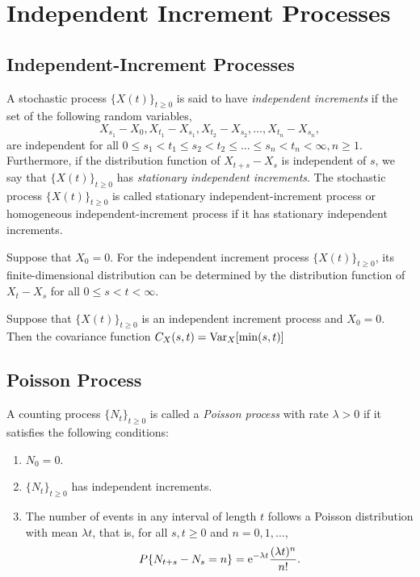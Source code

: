 \chapter{Independent Increment Processes}

\section{Independent-Increment Processes}

\begin{definition}
  A stochastic process \(\{X(t)\}_{t \geq 0}\) is said to have \emph{independent increments} if the set of the following random variables,
  \[
    X_{s_1} - X_{0}, X_{t_1} - X_{s_1}, X_{t_2} - X_{s_2}, \dots, X_{t_n} - X_{s_n},
  \]
  are independent for all \(0 \leq s_1 < t_1 \leq s_2 < t_2 \leq \dots \leq s_n < t_n < \infty, n \geq 1\). Furthermore, if the distribution function of \(X_{t + s} - X_{s}\) is independent of \(s\), we say that \(\{X(t)\}_{t \geq 0}\) has \emph{stationary independent increments}. The stochastic process \(\{X(t)\}_{t \geq 0}\) is called stationary independent-increment process or homogeneous independent-increment process if it has stationary independent increments.
\end{definition}

\begin{theorem}
  Suppose that \(X_0 = 0\). For the independent increment process \(\{X(t)\}_{t \geq 0}\), its finite-dimensional distribution can be determined by the distribution function of \(X_t - X_s\) for all \(0 \leq s < t < \infty\).
\end{theorem}

\begin{theorem}
  Suppose that \(\{X(t)\}_{t \geq 0}\) is an independent increment process and \(X_0 = 0\). Then the covariance function \(C_X(s, t) = \mathrm{Var}_X[\min(s, t)]\)
\end{theorem}

\section{Poisson Process}

\begin{definition}
  A counting process \(\{N_t\}_{t \geq 0}\) is called a \emph{Poisson process} with rate \(\lambda > 0\) if it satisfies the following conditions:
  \begin{enumerate}
    \item \(N_0 = 0\).
    \item \(\{N_t\}_{t \geq 0}\) has independent increments.
    \item The number of events in any interval of length \(t\) follows a Poisson distribution with mean \(\lambda t\), that is, for all \(s, t \geq 0\) and \(n = 0, 1, \dots\),
    \[
      P\{N_{t + s} - N_s = n\} = \mathrm{e}^{-\lambda t} \frac{(\lambda t)^n}{n!}.
    \]
  \end{enumerate}
\end{definition}

